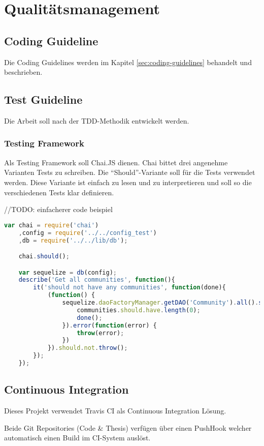 \chapter{Qualitätsmanagement}


\section{Coding Guideline}
Die Coding Guidelines werden im Kapitel \ref{sec:coding-guidelines}  behandelt und beschrieben.


\section{Test Guideline}
Die Arbeit soll nach der \gls{TDD}-Methodik entwickelt werden.

\subsection*{Testing Framework}
Als Testing Framework soll Chai.JS \cite{ChaiJS} dienen. Chai bittet drei angenehme Varianten Tests zu schreiben. Die ``Should''-Variante soll für die Tests verwendet werden. Diese Variante ist einfach zu lesen und zu interpretieren und soll so die verschiedenen Tests klar definieren. \newline

//TODO: einfacherer code beispiel
\begin{lstlisting}[language=JavaScript, caption=Chai.js Should Beispiel]
var chai = require('chai')
	,config = require('../../config_test')
	,db = require('../../lib/db');

	chai.should();

	var sequelize = db(config);
	describe('Get all communities', function(){
		it('should not have any communities', function(done){
			(function() {
				sequelize.daoFactoryManager.getDAO('Community').all().success(function(communities) {
					communities.should.have.length(0);
					done();
				}).error(function(error) {
					throw(error);
				})
			}).should.not.throw();
		});
	});
\end{lstlisting}


\section{Continuous Integration}
Dieses Projekt verwendet Travis CI als Continuous Integration Lösung.

Beide Git Repositories (Code \& Thesis) verfügen über einen \gls{PushHook} welcher automatisch einen Build im CI-System auslöst.


